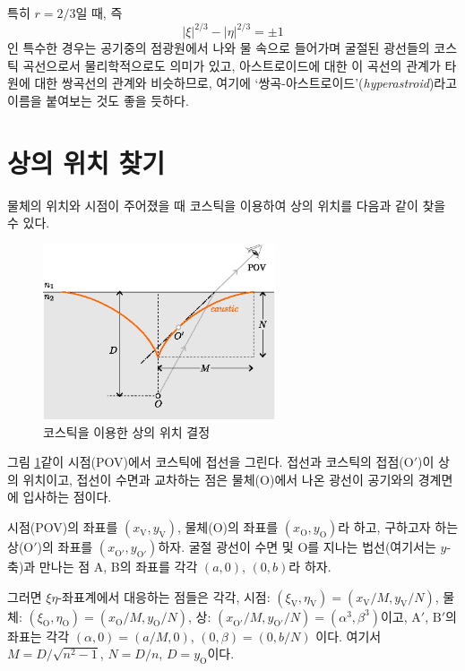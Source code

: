 \documentclass[twocolumn]{article}
\begin{document}
특히 $r = 2/3$일 때, 즉
$$ \left| \xi \right|^{2/3} - \left| \eta \right|^{2/3} = \pm1 $$
인 특수한 경우는 공기중의 점광원에서 나와 물 속으로 들어가며 굴절된 광선들의 코스틱 곡선으로서 
물리학적으로도 의미가 있고, 아스트로이드에 대한 이 곡선의 관계가 타원에 대한 쌍곡선의 관계와 
비슷하므로, 여기에 `쌍곡-아스트로이드'(\emph{hyperastroid})라고 이름을 붙여보는 것도 좋을 듯하다. 

\section{상의 위치 찾기}
물체의 위치와 시점이 주어졌을 때 코스틱을 이용하여 상의 위치를 다음과 같이 찾을 수 있다.

\begin{figure}[!h]
	\centering
	\includegraphics[width=2.7in]{figs/g394.eps}
	\caption{코스틱을 이용한 상의 위치 결정}
	\label{fig:image_caustic}
\end{figure}

그림 \ref{fig:image_caustic}\와 같이 시점(POV)에서 코스틱에 접선을 그린다. 접선과 코스틱의 접점($\mathrm{O'}$)이 상의 위치이고, 접선이 수면과 
교차하는 점은 물체($\mathrm{O}$)에서 나온 광선이 공기와의  경계면에 입사하는 점이다.

시점(POV)의 좌표를 $(x_{\mathrm{V}}^{}, y_{\mathrm{V}}^{})$, 물체($\mathrm{O}$)의 좌표를 $(x_{\mathrm{O}}^{}, y_{\mathrm{O}}^{})$라 하고, 구하고자 하는 상($\mathrm{O'}$)의 좌표를 $(x_{\mathrm{O'}}^{}, y_{\mathrm{O'}}^{})$\라 하자. 굴절 광선이 수면 및 $\mathrm{O}$를 지나는 법선(여기서는 $y$-축)과 만나는 점 A, B의 좌표를 각각 $(a, 0)$, $(0, b)$라 하자. 

그러면 $\xi\eta$-좌표계에서 대응하는 점들은 각각, 시점: $(\xi_{\mathrm{V}}^{}, \eta_{\mathrm{V}}^{})=(x_{\mathrm{V}}^{}/M, y_{\mathrm{V}}^{}/N)$, 물체: $(\xi_{\mathrm{O}}^{}, \eta_{\mathrm{O}}^{})=(x_{\mathrm{O}}^{}/M, y_{\mathrm{O}}^{}/N)$, 상: $(x_{\mathrm{O'}}^{}/M, y_{\mathrm{O'}}^{}/N)=(\alpha^3, \beta^3)$이고, $\mathrm{A'}$, $\mathrm{B'}$의 좌표는 각각 $(\alpha, 0)=(a/M, 0)$, $(0, \beta)=(0, b/N)$ 이다. 여기서 $M=D/\sqrt{n^2-1}$, $N=D/n$, $D=y_{\mathrm{O}}^{}$이다. 
\end{document}
